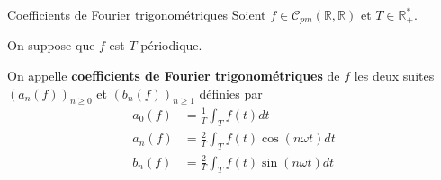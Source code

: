     \begin{prop}{Coefficients de Fourier trigonométriques}{}
        Soient $f \in \mathcal{C}_{pm}(\mathbb{R},\mathbb{R})$ et $T \in \mathbb{R}^*_+$.
        
        On suppose que $f$ est $T$-périodique.
        
        On appelle \textbf{coefficients de Fourier trigonométriques} de $f$ les deux suites $(a_n(f))_{n \geq 0}$ et $(b_n(f))_{n \geq 1}$ définies par 
        \begin{align*}
            a_0(f) &= \frac{1}{T} \int_{T} f(t)dt \\
            a_n(f) &= \frac{2}{T} \int_{T} f(t)\cos(n \omega t)dt \\
            b_n(f) &= \frac{2}{T} \int_{T} f(t)\sin(n \omega t)dt
        \end{align*}
    \end{prop}

